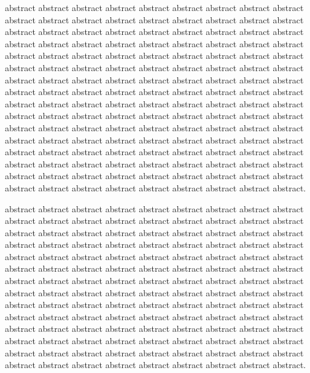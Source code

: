 
 abstract abstract abstract abstract abstract abstract abstract abstract abstract abstract abstract abstract abstract abstract abstract abstract abstract abstract abstract abstract abstract abstract abstract abstract abstract abstract abstract abstract abstract abstract abstract abstract abstract abstract abstract abstract abstract abstract abstract abstract abstract abstract abstract abstract abstract abstract abstract abstract abstract abstract abstract abstract abstract abstract abstract abstract abstract abstract abstract abstract abstract abstract abstract abstract abstract abstract abstract abstract abstract abstract abstract abstract abstract abstract abstract abstract abstract abstract abstract abstract abstract abstract abstract abstract abstract abstract abstract abstract abstract abstract abstract abstract abstract abstract abstract abstract abstract abstract abstract abstract abstract abstract abstract abstract abstract abstract abstract abstract abstract abstract abstract abstract abstract abstract abstract abstract abstract abstract abstract abstract abstract abstract abstract abstract abstract abstract abstract abstract abstract abstract abstract abstract abstract abstract abstract abstract abstract abstract abstract abstract abstract abstract abstract abstract.


 abstract abstract abstract abstract abstract abstract  abstract abstract abstract abstract abstract abstract abstract abstract abstract abstract abstract abstract abstract abstract abstract abstract abstract abstract abstract abstract abstract abstract abstract abstract abstract abstract abstract abstract abstract abstract abstract abstract abstract abstract abstract abstract abstract abstract abstract abstract abstract abstract abstract abstract abstract abstract abstract abstract abstract abstract abstract abstract abstract abstract abstract abstract abstract abstract abstract abstract abstract abstract abstract abstract abstract abstract abstract abstract abstract abstract abstract abstract abstract abstract abstract abstract abstract abstract abstract abstract abstract abstract abstract abstract abstract abstract abstract abstract abstract abstract abstract abstract abstract abstract abstract abstract abstract abstract abstract abstract abstract abstract abstract abstract abstract abstract abstract abstract abstract abstract abstract abstract abstract abstract abstract abstract abstract abstract abstract abstract.
\\


